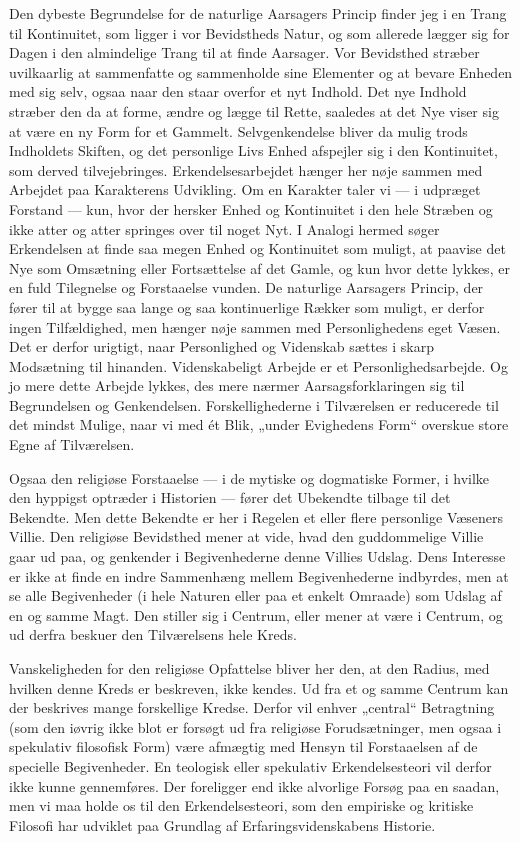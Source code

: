 \documentclass[12pt,a4paper,openany]{book}
\newcommand{\opage}[1]{\marginnote{\footnotesize\textit{[#1]}}}
\begin{document}
Den dybeste Begrundelse for de naturlige Aarsagers Princip finder jeg i
en Trang til Kontinuitet, som ligger i vor Bevidstheds Natur, og som
allerede lægger sig for Dagen i den almindelige Trang til at finde
Aarsager. Vor Bevidsthed stræber uvilkaarlig at sammenfatte og
sammenholde sine Elementer og at bevare Enheden med sig selv, ogsaa naar
den staar overfor et nyt Indhold. Det nye Indhold stræber den da at
forme, ændre og lægge til Rette, saaledes at det Nye viser sig at være
en ny Form for et Gammelt. Selvgenkendelse bliver da mulig trods
Indholdets Skiften, og det personlige Livs Enhed afspejler sig i den
Kontinuitet, som derved tilvejebringes. Erkendelsesarbejdet hænger her
nøje sammen med Arbejdet paa Karakterens Udvikling. Om en Karakter taler
vi --- i udpræget Forstand --- kun, hvor der hersker Enhed og
Kontinuitet i den hele Stræben og ikke atter og atter springes over til
noget Nyt. I Analogi hermed søger Erkendelsen at finde saa megen Enhed
og Kontinuitet som muligt, at paavise det Nye som Omsætning eller
Fortsættelse af det Gamle, og kun hvor dette lykkes, er en fuld
Tilegnelse og Forstaaelse vunden. De naturlige Aarsagers Princip, der
fører til at bygge saa lange og saa kontinuerlige Rækker som muligt, er
derfor ingen Tilfældighed, men hænger nøje sammen med Personlighedens
eget Væsen. Det er derfor urigtigt, naar Personlighed og Videnskab
sættes i skarp Modsætning til hinanden. Videnskabeligt Arbejde er et
Personlighedsarbejde. Og jo
\opage{20}mere dette Arbejde lykkes, des mere nærmer Aarsagsforklaringen
sig til Begrundelsen og Genkendelsen. Forskellighederne i Tilværelsen er
reducerede til det mindst Mulige, naar vi med ét Blik, „under Evighedens
Form“ overskue store Egne af Tilværelsen.

Ogsaa den religiøse Forstaaelse --- i de mytiske og dogmatiske Former, i
hvilke den hyppigst optræder i Historien --- fører det Ubekendte tilbage
til det Bekendte. Men dette Bekendte er her i Regelen et eller flere
personlige Væseners Villie. Den religiøse Bevidsthed mener at vide, hvad
den guddommelige Villie gaar ud paa, og genkender i Begivenhederne denne
Villies Udslag. Dens Interesse er ikke at finde en indre Sammenhæng
mellem Begivenhederne indbyrdes, men at se alle Begivenheder (i hele
Naturen eller paa et enkelt Omraade) som Udslag af en og samme Magt. Den
stiller sig i Centrum, eller mener at være i Centrum, og ud derfra
beskuer den Tilværelsens hele Kreds.

Vanskeligheden for den religiøse Opfattelse bliver her den, at den
Radius, med hvilken denne Kreds er beskreven, ikke kendes. Ud fra et og
samme Centrum kan der beskrives mange forskellige Kredse. Derfor vil
enhver „central“ Betragtning (som den iøvrig ikke blot er forsøgt ud fra
religiøse Forudsætninger, men ogsaa i spekulativ filosofisk Form) være
afmægtig med Hensyn til Forstaaelsen af de specielle Begivenheder. En
teologisk eller spekulativ Erkendelsesteori vil derfor ikke kunne
gennemføres. Der foreligger end ikke alvorlige Forsøg paa en saadan, men
vi maa holde os til den Erkendelsesteori, som den empiriske og kritiske
Filosofi har udviklet paa Grundlag af Erfaringsvidenskabens Historie.
\end{document}
